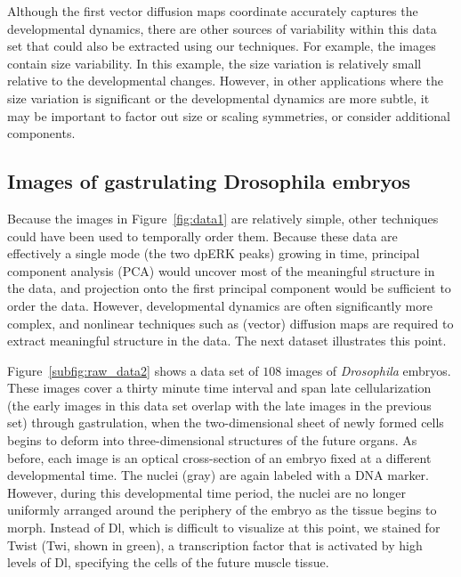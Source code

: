 \documentclass{pnastwo}
\begin{document}
\begin{article}
Although the first vector diffusion maps coordinate accurately captures the developmental dynamics, there are other sources of variability within this data set that could also be extracted using our techniques. 
%
For example, the images contain size variability. 
%
In this example, the size variation is relatively small relative to the developmental changes. 
%
However, in other applications where the size variation is significant or the developmental dynamics are more subtle, it may be important to factor out size or scaling symmetries, or consider additional components.


%

\subsection{Images of gastrulating  {\subsectionitfont Drosophila} embryos}

Because the images in Figure~\ref{fig:data1} are relatively simple, other techniques could have been used to temporally order them. 
%
Because these data are effectively a single mode (the two dpERK peaks) growing in time,
principal component analysis (PCA) \cite{shlens2005tutorial} would uncover most of the meaningful structure in the data, and projection onto the first principal component would be sufficient to order the data.
%
However, developmental dynamics are often significantly more complex, and nonlinear techniques such as (vector) diffusion maps are required to extract meaningful structure in the data. 
%
The next dataset illustrates this point.

Figure~\ref{subfig:raw_data2} shows a data set of $108$ images of {\it Drosophila} embryos.
%
These images cover a thirty minute time interval and span late cellularization (the early images in this data set overlap with the late images in the previous set) through gastrulation, when the two-dimensional sheet of newly formed cells begins to deform into three-dimensional structures of the future organs. 
%
As before, each image is an optical cross-section of an embryo fixed at a different developmental time.
%
The nuclei (gray) are again labeled with a DNA marker.
%
However, during this developmental time period, the nuclei are no longer uniformly arranged around the periphery of the embryo as the tissue begins to morph.
%
Instead of Dl, which is difficult to visualize at this point, we stained for Twist (Twi, shown in green), a transcription factor that is activated by high levels of Dl, specifying the cells of the future muscle tissue.
%


\end{article}
\end{document}
